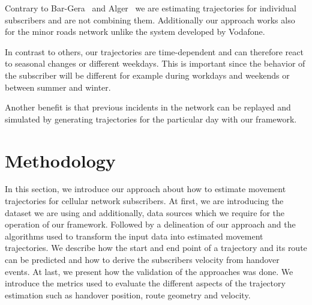 Contrary to Bar-Gera~\cite{Bar2007} and Alger~\cite{Alger2004} we are estimating trajectories for individual subscribers and are not combining them. Additionally our approach works also for the minor roads network unlike the system developed by Vodafone.

In contrast to others, our trajectories are time-dependent and can therefore react to seasonal changes or different weekdays. This is important since the behavior of the subscriber will be different for example during workdays and weekends or between summer and winter.

Another benefit is that previous incidents in the network can be replayed and simulated by generating trajectories for the particular day with our framework.


\section{Methodology}

In this section, we introduce our approach about how to estimate movement trajectories for cellular network subscribers. At first, we are introducing the dataset we are using and additionally, data sources which we require for the operation of our framework. Followed by a delineation of our approach and the algorithms used to transform the input data into estimated movement trajectories. We describe how the start and end point of a trajectory and its route can be predicted and how to derive the subscribers velocity from handover events. At last, we present how the validation of the approaches was done. We introduce the metrics used to evaluate the different aspects of the trajectory estimation such as handover position, route geometry and velocity. 


